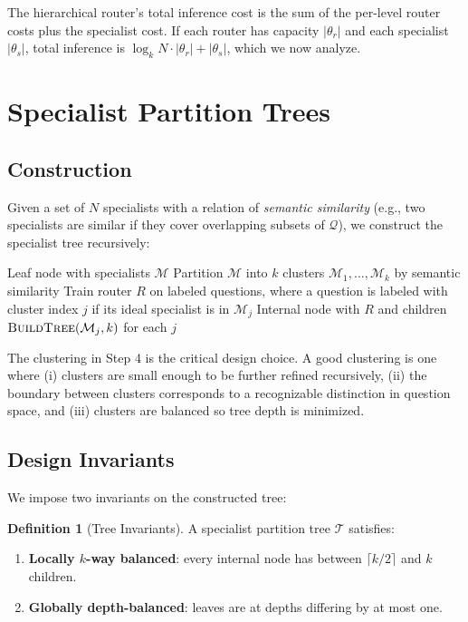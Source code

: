 \documentclass[11pt,twocolumn,a4paper]{article}
\theoremstyle{definition}
\newtheorem{definition}[theorem]{Definition}
\theoremstyle{remark}
\newcommand{\Qc}{\mathcal{Q}}
\newcommand{\Tc}{\mathcal{T}}
\newcommand{\Mc}{\mathcal{M}}
\begin{document}
The hierarchical router's total inference cost is the sum of the per-level router costs plus the specialist cost. If each router has capacity $|\theta_r|$ and each specialist $|\theta_s|$, total inference is $\log_k N \cdot |\theta_r| + |\theta_s|$, which we now analyze.

\section{Specialist Partition Trees}
\label{sec:tree}

\subsection{Construction}

Given a set of $N$ specialists with a relation of \emph{semantic similarity} (e.g., two specialists are similar if they cover overlapping subsets of $\Qc$), we construct the specialist tree recursively:

\begin{algorithm}
\caption{Build Specialist Tree}
\label{alg:build}
\begin{algorithmic}[1]
\Function{BuildTree}{$\Mc$, $k$}
    \If{$|\Mc| \leq k$}
        \State \Return Leaf node with specialists $\Mc$
    \EndIf
    \State Partition $\Mc$ into $k$ clusters $\Mc_1, \ldots, \Mc_k$ by semantic similarity
    \State Train router $R$ on labeled questions, where a question is labeled with cluster index $j$ if its ideal specialist is in $\Mc_j$
    \State \Return Internal node with $R$ and children $\Call{BuildTree}{\Mc_j, k}$ for each $j$
\EndFunction
\end{algorithmic}
\end{algorithm}

The clustering in Step 4 is the critical design choice. A good clustering is one where (i) clusters are small enough to be further refined recursively, (ii) the boundary between clusters corresponds to a recognizable distinction in question space, and (iii) clusters are balanced so tree depth is minimized.

\subsection{Design Invariants}

We impose two invariants on the constructed tree:

\begin{definition}[Tree Invariants]
\label{def:invariants}
A specialist partition tree $\Tc$ satisfies:
\begin{enumerate}
    \item \textbf{Locally $k$-way balanced}: every internal node has between $\lceil k/2 \rceil$ and $k$ children.
    \item \textbf{Globally depth-balanced}: leaves are at depths differing by at most one.
\end{enumerate}
\end{definition}
\end{document}
